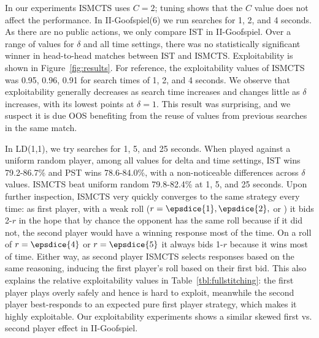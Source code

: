 \documentclass[letterpaper]{article}
\newcommand{\defword}[1]{\textbf{\boldmath{#1}}}
\begin{document}
 

In our experiments ISMCTS uses $C = 2$; tuning shows that the $C$ value does not 
affect the performance. 
In II-Goofspiel(6) we run searches for 1, 2, and 4 seconds.
As there are no public actions, we only compare IST in II-Goofspiel. 
Over a range of values for $\delta$ and all time settings, there was no statistically significant
winner in head-to-head matches between IST and ISMCTS. 
Exploitability is shown in Figure~\ref{fig:results}. 
For reference, the exploitability values of ISMCTS was 0.95, 0.96, 0.91 for search times of 
1, 2, and 4 seconds. We observe that exploitability generally 
decreases as search time increases and changes little as $\delta$ increases, with its 
lowest points at $\delta = 1$. 
This result was surprising, and we suspect it is due OOS benefiting from the reuse of 
values from previous searches in the same match. 

In LD(1,1), we try searches for 1, 5, and 25 seconds. 
When played against a uniform random player, among all values for delta and time settings, 
IST wins 79.2-86.7\% and PST wins 78.6-84.0\%, with a non-noticeable differences across $\delta$ values. 
ISMCTS beat uniform random 79.8-82.4\% at 1, 5, and 25 seconds. 
Upon further inspection, ISMCTS very quickly converges to the same strategy every time: as first player, 
with a weak roll ($r = \epsdice{1}, \epsdice{2},$ or ) it bids 2-$r$ in the hope that by chance the
opponent has the same roll because if it did not, the second player would have a winning response most of the time.
On a roll of $r = \epsdice{4}$ or $r = \epsdice{5}$ it always bids 1-$r$ because it wins most of time. Either way, as 
second player ISMCTS selects responses based on the same reasoning, inducing the first player's roll based on their
first bid. This also explains the relative exploitability values in Table~\ref{tbl:fullstitching}: the first player
plays overly safely and hence is hard to exploit, meanwhile the second player best-responds to an expected pure first 
player strategy, which makes it highly exploitable. 
Our exploitability experiments shows a similar skewed first vs. second player effect in II-Goofspiel. 
\end{document}
